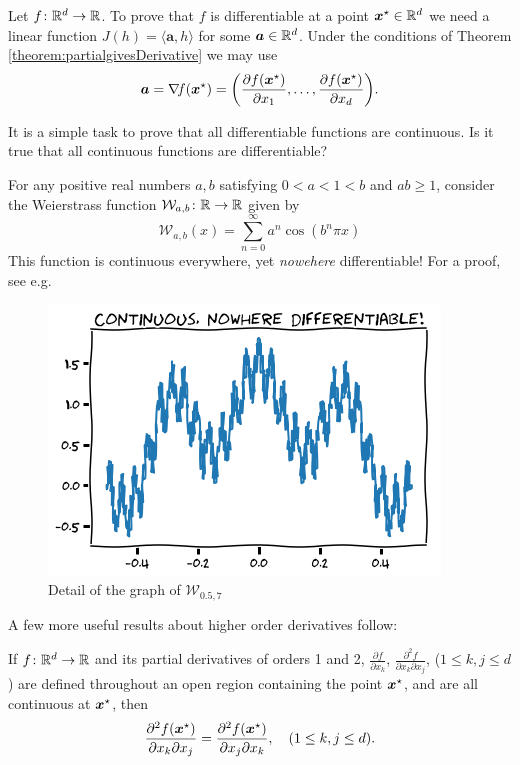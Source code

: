 \begin{example}\label{example:gradient}
Let $f\colon \mathbb{R}^d \to \mathbb{R}$.  To prove that $f$ is differentiable at a point $\boldsymbol{x}^{\star} \in \mathbb{R}^d$ we need a linear function $J(h) = \langle \boldsymbol{a}, h \rangle$ for some $\boldsymbol{a} \in \mathbb{R}^d$.  Under the conditions of Theorem \ref{theorem:partialgivesDerivative} we may use
\begin{equation*}
\boldsymbol{a} = \mathop{\nabla\! {f}}(\boldsymbol{x}^{\star})= \bigg( \frac{\partial f (\boldsymbol{x}^{\star})}{\partial x_1}, \dotsc, \frac{\partial f (\boldsymbol{x}^{\star})}{\partial x_d} \bigg).
\end{equation*}
\end{example}
It is a simple task to prove that all differentiable functions are continuous.  Is it true that all continuous functions are differentiable?

\begin{example}\label{example:WeierstrassFunction}
For any positive real numbers $a, b$ satisfying $0<a<1<b$ and $ab \geq 1$, consider the Weierstrass function $\mathcal{W}_{a,b} \colon \mathbb{R} \to \mathbb{R}$ given by 
\begin{equation*}
\mathcal{W}_{a,b}(x) = \sum_{n=0}^\infty a^n \cos(b^n \pi x)
\end{equation*}
This function is continuous everywhere, yet \emph{nowehere} differentiable!  For a proof, see e.g.~\cite{hardy1916weierstrass}
\begin{figure}[ht!]
\includegraphics[width=0.6\linewidth]{images/weierstrass.png}
\caption{Detail of the graph of $\mathcal{W}_{0.5, 7}$}
\label{figure:WeierstrassFunction}
\end{figure}
\end{example}

A few more useful results about higher order derivatives follow:

\begin{theorem}[Clairaut]\label{theorem:MixedDerivatives}
If $f\colon \mathbb{R}^d \to \mathbb{R}$ and its partial derivatives of orders 1 and 2, $\frac{\partial f}{\partial x_k}$, $\frac{\partial^2 f}{\partial x_k \partial x_j}$, ($1\leq k,j \leq d$) are defined throughout an open region containing the point $\boldsymbol{x}^{\star}$, and are all continuous at $\boldsymbol{x}^{\star}$, then 
\begin{equation*}
\frac{\partial^2 f(\boldsymbol{x}^{\star})}{\partial x_k \partial x_j} = \frac{\partial^2 f(\boldsymbol{x}^{\star})}{\partial x_j \partial x_k}, \quad (1\leq k,j \leq d). 
\end{equation*}
\end{theorem}

